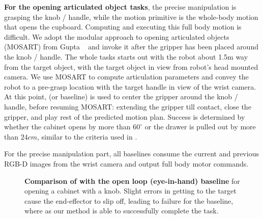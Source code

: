 {\bf For the opening articulated object tasks}, the precise manipulation is grasping the
knob / handle, while the motion primitive is the whole-body motion that opens
the cupboard. Computing and executing this full body motion is difficult. We
adopt the modular approach to opening articulated objects (MOSART) from Gupta \etal~\cite{gupta2024opening} and invoke it
after the gripper has been placed around the knob / handle. The whole tasks 
starts out with the robot about 1.5m way from the target object, with the 
target object in view
from robot's head mounted camera. We use MOSART to compute articulation
parameters and convey the robot to a pre-grasp
location with the target handle in view of the wrist camera. At this point,
\name (or baseline) is used to center the gripper around the knob / handle, 
before resuming MOSART: extending the gripper till contact, close the gripper, and play rest of the predicted motion plan. Success is 
determined by whether the cabinet opens by more than $60^\circ$
or the drawer is pulled out by more than $24cm$, similar to the criteria used in \cite{gupta2024opening}.


For the precise manipulation part, all baselines consume the current and
previous RGB-D images from the wrist camera and output full body motor
commands.



\begin{figure*}
\caption{{\bf Comparison of \name with the open loop (eye-in-hand) baseline} for opening a cabinet with a knob. Slight errors in getting to the target cause the end-effector to slip off, leading to failure for the baseline, where as our method is able to successfully complete the task.}
\end{figure*}

\begin{table}
\setlength{\tabcolsep}{8pt}
  \centering
  \caption{Comparison of \name \vs RUM~\cite{etukuru2024robot}, a recent large-scale end-to-end imitation learning method trained on 1200 demos for opening cabinets and 525 demos for opening drawers across 40 different environments. Our evaluation spans objects from three environments across two buildings.}
\end{table}

